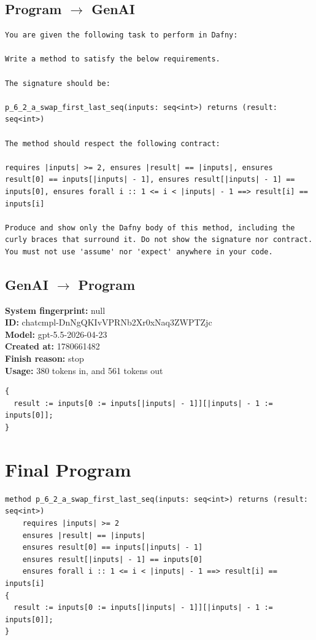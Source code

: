 \documentclass{article}
\begin{document}
\subsection*{Program $\rightarrow$ GenAI}
\begin{lstlisting}
You are given the following task to perform in Dafny:

Write a method to satisfy the below requirements.

The signature should be:

p_6_2_a_swap_first_last_seq(inputs: seq<int>) returns (result: seq<int>)

The method should respect the following contract:

requires |inputs| >= 2, ensures |result| == |inputs|, ensures result[0] == inputs[|inputs| - 1], ensures result[|inputs| - 1] == inputs[0], ensures forall i :: 1 <= i < |inputs| - 1 ==> result[i] == inputs[i]

Produce and show only the Dafny body of this method, including the curly braces that surround it. Do not show the signature nor contract. You must not use 'assume' nor 'expect' anywhere in your code.
\end{lstlisting}
\subsection*{GenAI $\rightarrow$ Program}
\textbf{System fingerprint: }null
\\\textbf{ID: }chatcmpl-DnNgQKIvVPRNb2Xr0xNaq3ZWPTZjc
\\\textbf{Model: }gpt-5.5-2026-04-23
\\\textbf{Created at: }1780661482
\\\textbf{Finish reason: }stop
\\\textbf{Usage: }380 tokens in, and 561 tokens out
\begin{lstlisting}
{
  result := inputs[0 := inputs[|inputs| - 1]][|inputs| - 1 := inputs[0]];
}
\end{lstlisting}
\section*{Final Program}
\begin{lstlisting}
method p_6_2_a_swap_first_last_seq(inputs: seq<int>) returns (result: seq<int>)
	requires |inputs| >= 2
	ensures |result| == |inputs|
	ensures result[0] == inputs[|inputs| - 1]
	ensures result[|inputs| - 1] == inputs[0]
	ensures forall i :: 1 <= i < |inputs| - 1 ==> result[i] == inputs[i]
{
  result := inputs[0 := inputs[|inputs| - 1]][|inputs| - 1 := inputs[0]];
}
\end{lstlisting}
\end{document}
